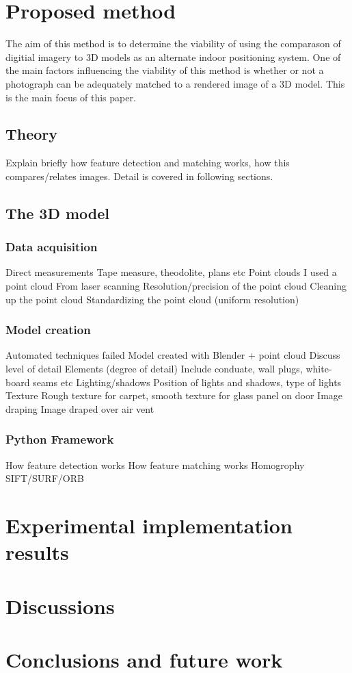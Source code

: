 \documentclass[11pt,a4paper]{article}
\begin{document}
\newpage
\section{Proposed method}
	The aim of this method is to determine the viability of using the comparason of digitial imagery to 3D models as an alternate indoor positioning system. One of the main factors influencing the viability of this method is whether or not a photograph can be adequately matched to a rendered image of a 3D model. This is the main focus of this paper.
	
	\subsection{Theory}
		Explain briefly how feature detection and matching works, how this compares/relates images. Detail is covered in following sections.
		
	\subsection{The 3D model}
		\subsubsection{Data acquisition}
			Direct measurements
				Tape measure, theodolite, plans etc
			Point clouds
				I used a point cloud
				From laser scanning
				Resolution/precision of the point cloud
				Cleaning up the point cloud
				Standardizing the point cloud (uniform resolution)
		\subsubsection{Model creation}
			Automated techniques failed
			Model created with Blender + point cloud
			Discuss level of detail
				Elements (degree of detail)
					Include conduate, wall plugs, white-board seams etc
				Lighting/shadows
					Position of lights and shadows, type of lights
				Texture
					Rough texture for carpet, smooth texture for glass panel on door
				Image draping
					Image draped over air vent
		\subsubsection{Python Framework}
			How feature detection works
			How feature matching works
			Homogrophy
			SIFT/SURF/ORB
					

\section{Experimental implementation results}

\section{Discussions}

\section{Conclusions and future work}

\newpage
\printbibliography
\end{document}
